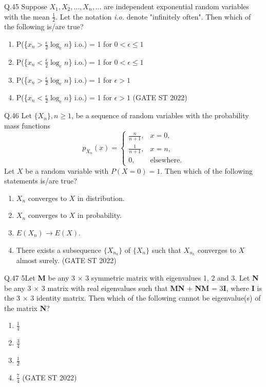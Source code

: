 \documentclass[journal,12pt,onecolumn]{IEEEtran}
\theoremstyle{remark}
\begin{document}
Q.45 Suppose \(X_1, X_2, \ldots, X_n, \ldots\) are independent exponential random variables with the mean \(\frac{1}{2}\). Let the notation \emph{i.o.} denote "infinitely often". Then which of the following is/are true?
\begin{enumerate}[label=\alph*.] 
	\item P(\{$x_n > \frac{\epsilon}{2}\log_en$\} i.o.) = 1 for $0 < \epsilon \leq 1$
	\item P(\{$x_n < \frac{\epsilon}{2}\log_en$\} i.o.) = 1 for $0 < \epsilon \leq 1$
	\item P(\{$x_n > \frac{\epsilon}{2}\log_en$\} i.o.) = 1 for $\epsilon > 1$
	\item P(\{$x_n < \frac{\epsilon}{2}\log_en$\} i.o.) = 1 for $\epsilon > 1$
	\hfill (GATE ST 2022)
\end{enumerate}
	\vspace{2em}
Q.46 Let \(\{X_n\}, n \ge 1\), be a sequence of random variables with the probability mass functions
\[
p_{X_n}(x) = 
\begin{cases}
	\frac{n}{n+1}, & x = 0, \\[6pt]
	\frac{1}{n+1}, & x = n, \\[6pt]
	0, & \text{elsewhere}.
\end{cases}
\]
Let \(X\) be a random variable with \(P(X=0)=1\). Then which of the following statements is/are true?
\begin{enumerate}[label=\Alph*.] 
	\item \(X_n\) converges to \(X\) in distribution.
	\item \(X_n\) converges to \(X\) in probability.
	\item \(E(X_n) \longrightarrow E(X)\).
	\item There exists a subsequence \(\{X_{n_k}\}\) of \(\{X_n\}\) such that \(X_{n_k}\) converges to \(X\) almost surely.
	\hfill (GATE ST 2022)
\end{enumerate}
	\vspace{2em}
Q.47 5Let \textbf{M} be any 3 × 3 symmetric matrix with eigenvalues 1, 2 and 3. Let \textbf{N} be any 3 × 3 matrix with real eigenvalues such that \textbf{MN} + \textbf{NM} = 3\textbf{I}, where \textbf{I} is the 3 × 3 identity matrix. Then which of the following cannot be eigenvalue(s) of the matrix \textbf{N}?
\begin{enumerate}[label=\Alph*.] 
	\item $\frac{1}{4}$ 
	\item $\frac{3}{4}$
	\item $\frac{1}{2}$
	\item $\frac{7}{4}$
	\hfill (GATE ST 2022)
\end{enumerate}
\end{document}
